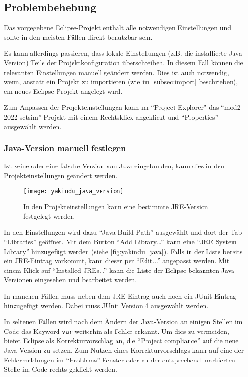 \subsection{Problembehebung}

Das vorgegebene Eclipse-Projekt enthält alle notwendigen Einstellungen und sollte in den meisten Fällen direkt benutzbar sein.

Es kann allerdings passieren, dass lokale Einstellungen (z.B. die installierte Java-Version) Teile der Projektkonfiguration überschreiben. In diesem Fall können die relevanten Einstellungen manuell geändert werden.
Dies ist auch notwendig, wenn, anstatt ein Projekt zu importieren (wie im \autoref{subsec:import} beschrieben), ein neues Eclipse-Projekt angelegt wird.

Zum Anpassen der Projekteinstellungen kann im \enquote{Project Explorer} das \enquote{mod2-2022-sctsim}-Projekt mit einem Rechtsklick angeklickt und \enquote{Properties} ausgewählt werden.

\enlargethispage{1\baselineskip}

\subsubsection{Java-Version manuell festlegen} 

Ist keine oder eine falsche Version von Java eingebunden, kann dies in den Projekteinstellungen geändert werden.


\begin{figure}
	\centering
	\texttt{[image: yakindu\_java\_version]}
	\caption{In den Projekteinstellungen kann eine bestimmte JRE-Version festgelegt werden}
	\label{fig:yakindu_java}
\end{figure}

In den Einstellungen wird dazu \enquote{Java Build Path} ausgewählt und dort der Tab \enquote{Libraries} geöffnet. Mit dem Button \enquote{Add Library...} kann eine \enquote{JRE System Library} hinzugefügt werden (siehe \autoref{fig:yakindu_java}).
Falls in der Liste bereits ein JRE-Eintrag vorkommt, kann dieser per \enquote{Edit...} angepasst werden. 
Mit einem Klick auf \enquote{Installed JREs...} kann die Liste der Eclipse bekannten Java-Versionen eingesehen und bearbeitet werden.

In manchen Fällen muss neben dem JRE-Eintrag auch noch ein JUnit-Eintrag hinzugefügt werden. 
Dabei muss JUnit Version 4 ausgewählt werden.

In seltenen Fällen wird nach dem Ändern der Java-Version an einigen Stellen im Code das Keyword \texttt{var} weiterhin als Fehler erkannt. 
Um dies zu vermeiden, bietet Eclipse als Korrekturvorschlag an, die \enquote{Project compliance} auf die neue Java-Version zu setzen. 
Zum Nutzen eines Korrekturvorschlags kann auf eine der Fehlermeldungen im \enquote{Problems}-Fenster oder an der entsprechend markierten Stelle im Code rechts geklickt werden.




